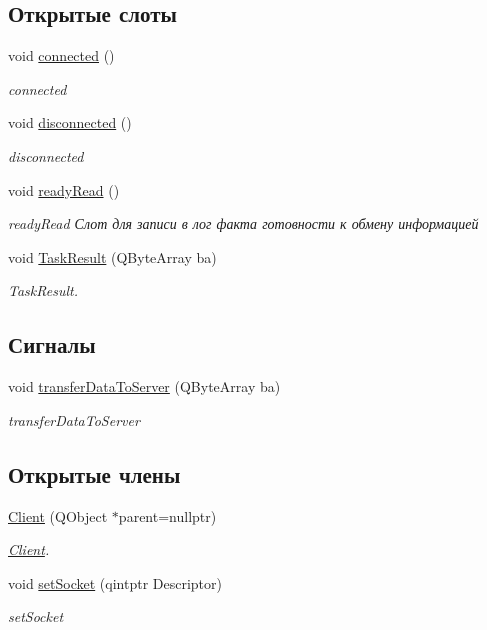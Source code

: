 \subsection*{Открытые слоты}
\begin{DoxyCompactItemize}
\item 
void \hyperlink{classClient_a5f3de6434245dc99ceac8601806cb6b1}{connected} ()
\begin{DoxyCompactList}\small\item\em connected \end{DoxyCompactList}\item 
void \hyperlink{classClient_ac2cdeb8b0249c1bf0ddd2167da861ad4}{disconnected} ()
\begin{DoxyCompactList}\small\item\em disconnected \end{DoxyCompactList}\item 
void \hyperlink{classClient_acfd4db27c0fec82a26e4d112b585b534}{ready\+Read} ()
\begin{DoxyCompactList}\small\item\em ready\+Read Слот для записи в лог факта готовности к обмену информацией \end{DoxyCompactList}\item 
void \hyperlink{classClient_a21d8173cfcb182fe554a0828c5dea8be}{Task\+Result} (Q\+Byte\+Array ba)
\begin{DoxyCompactList}\small\item\em Task\+Result. \end{DoxyCompactList}\end{DoxyCompactItemize}
\subsection*{Сигналы}
\begin{DoxyCompactItemize}
\item 
void \hyperlink{classClient_ae73142778c856392f6b40803558461df}{transfer\+Data\+To\+Server} (Q\+Byte\+Array ba)
\begin{DoxyCompactList}\small\item\em transfer\+Data\+To\+Server \end{DoxyCompactList}\end{DoxyCompactItemize}
\subsection*{Открытые члены}
\begin{DoxyCompactItemize}
\item 
\hyperlink{classClient_a5b62b1caeb5c2c35a2ae367851d3ad92}{Client} (Q\+Object $\ast$parent=nullptr)
\begin{DoxyCompactList}\small\item\em \hyperlink{classClient}{Client}. \end{DoxyCompactList}\item 
void \hyperlink{classClient_a38b742b4f0fbb661f4884686899ea5c2}{set\+Socket} (qintptr Descriptor)
\begin{DoxyCompactList}\small\item\em set\+Socket \end{DoxyCompactList}\end{DoxyCompactItemize}
